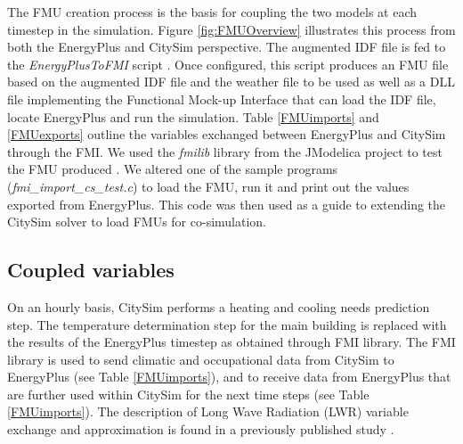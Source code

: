 \documentclass{tBPS2e}
\theoremstyle{plain}
\theoremstyle{definition}
\theoremstyle{remark}
\begin{document}
The FMU creation process is the basis for coupling the two models at each timestep in the simulation. Figure \ref{fig:FMUOverview} illustrates this process from both the EnergyPlus and CitySim perspective. The augmented IDF file is fed to the \emph{EnergyPlusToFMI} script \citep{Nouidui:2014bo}. Once configured, this script produces an FMU file based on the augmented IDF file and the weather file to be used as well as a DLL file implementing the Functional Mock-up Interface that can load the IDF file, locate EnergyPlus and run the simulation. Table \ref{FMUimports} and \ref{FMUexports} outline the variables exchanged between EnergyPlus and CitySim through the FMI. We used the \emph{fmilib} library from the JModelica project to test the FMU produced \citep{Anonymous:ZZTfF80-}. We altered one of the sample programs (\emph{fmi\_import\_cs\_test.c}) to load the FMU, run it and print out the values exported from EnergyPlus. This code was then used as a guide to extending the CitySim solver to load FMUs for co-simulation.

\subsection{Coupled variables}

On an hourly basis, CitySim performs a heating and cooling needs prediction step. The temperature determination step for the main building is replaced with the results of the EnergyPlus timestep as obtained through FMI library. The FMI library is used to send climatic and occupational data from CitySim to EnergyPlus (see Table \ref{FMUimports}), and to receive data from EnergyPlus that are further used within CitySim for the next time steps (see Table \ref{FMUimports}). The description of Long Wave Radiation (LWR) variable exchange and approximation is found in a previously published study \citep{Miller:2015vk}.
\end{document}
